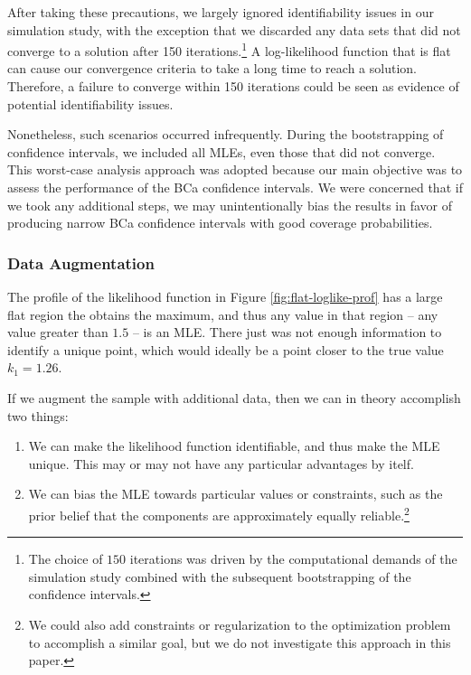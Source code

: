 \documentclass[
]{article}
\begin{document}
After taking these precautions, we largely ignored identifiability
issues in our simulation study, with the exception that we discarded any
data sets that did not converge to a solution after 150
iterations.\footnote{The choice of $150$ iterations was driven by the computational demands of the
simulation study combined with the subsequent bootstrapping of the confidence intervals.
} A log-likelihood function that is flat can cause our convergence
criteria to take a long time to reach a solution. Therefore, a failure
to converge within 150 iterations could be seen as evidence of potential
identifiability issues.

Nonetheless, such scenarios occurred infrequently. During the
bootstrapping of confidence intervals, we included all MLEs, even those
that did not converge. This worst-case analysis approach was adopted
because our main objective was to assess the performance of the BCa
confidence intervals. We were concerned that if we took any additional
steps, we may unintentionally bias the results in favor of producing
narrow BCa confidence intervals with good coverage probabilities.

\hypertarget{data-augmentation}{%
\subsubsection*{Data Augmentation}\label{data-augmentation}}

The profile of the likelihood function in Figure
\ref{fig:flat-loglike-prof} has a large flat region the obtains the
maximum, and thus any value in that region -- any value greater than
\(1.5\) -- is an MLE. There just was not enough information to identify
a unique point, which would ideally be a point closer to the true value
\(k_1 = 1.26\).

If we augment the sample with additional data, then we can in theory
accomplish two things:

\begin{enumerate}
\def\labelenumi{\arabic{enumi}.}
\item
  We can make the likelihood function identifiable, and thus make the
  MLE unique. This may or may not have any particular advantages by
  itelf.
\item
  We can bias the MLE towards particular values or constraints, such as
  the prior belief that the components are approximately equally
  reliable.\footnote{We could also add constraints or
  regularization to the optimization problem to accomplish a similar goal, but we do not
  investigate this approach in this paper.}
\end{enumerate}
\end{document}
